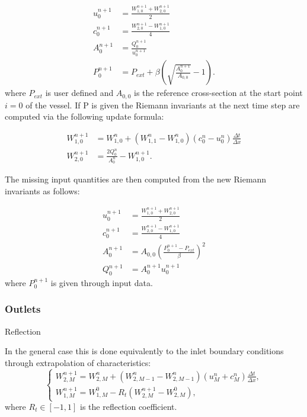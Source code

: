 \documentclass[a4paper, oneside]{discothesis}
\begin{document}
\begin{align}
	u_0^{n+1} &= \frac{W_{1,0}^{n+1} + W_{2,0}^{n+1}}{2} \\
	c_0^{n+1} &= \frac{W_{2,0}^{n+1} - W_{1,0}^{n+1}}{4} \\
	A_0^{n+1} &= \frac{Q_0^{n+1}}{u_0^{n+1}} \\
	P_0^{n+1} &= P_{ext} + \beta \left( \sqrt{\frac{A_0^{n+1}}{A_{0,0}}} - 1 \right). 
\end{align}
where $P_{ext}$ is user defined and $A_{0,0}$ is the reference cross-section at the start point $i=0$ of the vessel.
If P is given the Riemann invariants at the next time step are computed via the following update formula:

\begin{align}
	W_{1,0}^{n+1} &= W^n_{1,0} + (W^n_{1,1} - W^n_{1,0})(c^n_0-u^n_0) \frac{\Delta t}{\Delta x} \label{update1b}\\
	W_{2,0}^{n+1} &= \frac{2Q^{n}_0}{A^n_0} - W^{n+1}_{1,0} \label{update2b}.
\end{align}

The missing input quantities are then computed from the new Riemann invariants as follows:

\begin{align}
	u_0^{n+1} &= \frac{W_{1,0}^{n+1} + W_{2,0}^{n+1}}{2} \\
	c_0^{n+1} &= \frac{W_{2,0}^{n+1} - W_{1,0}^{n+1}}{4} \\
	A_0^{n+1} &= A_{0,0}\left(\frac{P_0^{n+1}-P_{ext}}{\beta}\right)^2\\
	Q_0^{n+1} &= A_0^{n+1} u_0^{n+1}
\end{align}
where $P^{n+1}_0$ is given through input data.
\subsubsection{Outlets} \label{sssec:outl}

Reflection

In the general case this is done equivalently to the inlet boundary conditions through extrapolation of characteristics:
\begin{equation}
	\left\{\begin{array}{l}
			W_{2,M}^{n+1}=W_{2,M}^n+(W_{2,M-1}^n-W_{2,M-1}^n) (u_M^n+c_M^n) \frac{\Delta t}{\Delta x}, \\
			W_{1,M}^{n+1}=W_{1,M}^0-R_t (W_{2,M}^{n+1}-W_{2,M}^0),
	\end{array}\right.
\end{equation}
where $R_t \in [-1,1]$ is the reflection coefficient.
\end{document}
